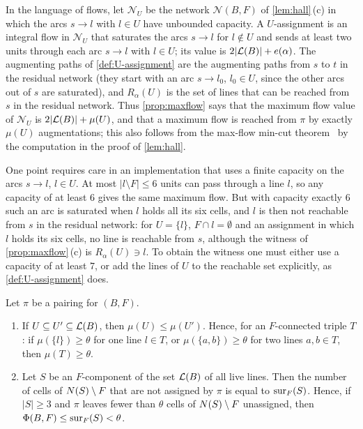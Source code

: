 \begin{remark}[Flows]\label{rem:flow}
In the language of flows, let $\mathcal N_U$ be the network $\mathcal N(B,F)$ of \cref{lem:hall}\,(c) in
which the arcs $s\to l$ with $l\in U$ have unbounded capacity. A $U$-assignment is an integral flow in
$\mathcal N_U$ that saturates the arcs $s\to l$ for $l\notin U$ and sends at least two units through
each arc $s\to l$ with $l\in U$; its value is $2|\mathcal{L}(B)|+e(\alpha)$. The
augmenting paths of \cref{def:U-assignment} are the augmenting paths from $s$ to $t$ in the residual
network (they start with an arc $s\to l_0$, $l_0\in U$, since the other arcs out of $s$ are saturated),
and $R_\alpha(U)$ is the set of lines that can be reached from $s$ in the residual network. Thus
\cref{prop:maxflow} says that the maximum flow value of $\mathcal N_U$ is $2|\mathcal{L}(B)|+\mu(U)$, and that
a maximum flow is reached from $\pi$ by exactly $\mu(U)$ augmentations; this also follows from the
max-flow min-cut theorem~\cite{FordFulkerson1962} by the computation in the proof of \cref{lem:hall}.

One point requires care in an implementation that uses a finite capacity on the arcs $s\to l$, $l\in U$.
At most $|l\setminus F|\le 6$ units can pass through a line $l$, so any capacity of at least $6$ gives
the same maximum flow. But with capacity exactly $6$ such an arc is saturated when $l$ holds all its six
cells, and $l$ is then not reachable from $s$ in the residual network: for $U=\{l\}$, $F\cap
l=\emptyset$ and an assignment in which $l$ holds its six cells, no line is reachable from $s$, although
the witness of \cref{prop:maxflow}\,(c) is $R_\alpha(U)\ni l$. To obtain the witness one must either use a
capacity of at least $7$, or add the lines of $U$ to the reachable set explicitly, as
\cref{def:U-assignment} does.
\end{remark}

\begin{corollary}\label{cor:pruning}
Let $\pi$ be a pairing for $(B,F)$.
\begin{enumerate}[label=\textup{(\alph*)}]
\item If $U\subseteq U'\subseteq\mathcal{L}(B)$, then $\mu(U)\le\mu(U')$. Hence, for an $F$-connected triple $T$:
      if $\mu(\{l\})\ge\theta$ for one line $l\in T$, or $\mu(\{a,b\})\ge\theta$ for two lines $a,b\in T$,
      then $\mu(T)\ge\theta$.
\item Let $S$ be an $F$-component of the set $\mathcal{L}(B)$ of all live lines. Then the number of cells of
      $N(S)\setminus F$ that are not assigned by $\pi$ is equal to $\operatorname{sur}_F(S)$. Hence, if $|S|\ge 3$ and
      $\pi$ leaves fewer than $\theta$ cells of $N(S)\setminus F$ unassigned, then
      $\Phi(B,F)\le\operatorname{sur}_F(S)<\theta$.
\end{enumerate}
\end{corollary}

